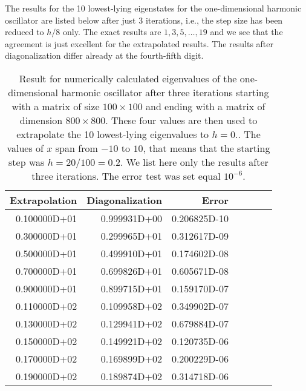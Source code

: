 The results for the 10 lowest-lying eigenstates for the one-dimensional harmonic oscillator
are listed below after just 3 iterations, i.e., the step size has been reduced to $h/8$ only.
The exact results are $1,3,5,\dots,19$ and we see that the agreement is just excellent for the 
extrapolated results. The results after diagonalization differ already at the fourth-fifth digit. 
\begin{table}[hbtp]
\caption{Result  for numerically calculated eigenvalues of the one-dimensional harmonic oscillator
         after three iterations starting with a matrix of size $100\times 100$ and ending
         with a matrix of dimension $800\times 800$. These four values are then used to
         extrapolate the 10 lowest-lying eigenvalues to $h=0.$. The values of $x$ span
         from $-10$ to $10$, that means that the starting step was $h=20/100=0.2$. We list here
         only the results after three iterations. The error test was set equal $10^{-6}$.}
\begin{center} 
\begin{tabular}{rrrrrrr}\hline
Extrapolation&Diagonalization&Error\\\hline
0.100000D+01&  0.999931D+00&  0.206825D-10\\
0.300000D+01 & 0.299965D+01 & 0.312617D-09\\
0.500000D+01 & 0.499910D+01 & 0.174602D-08\\
0.700000D+01 & 0.699826D+01 & 0.605671D-08\\
0.900000D+01 & 0.899715D+01 & 0.159170D-07\\
0.110000D+02 & 0.109958D+02 & 0.349902D-07\\
0.130000D+02 & 0.129941D+02 & 0.679884D-07\\
0.150000D+02 & 0.149921D+02 & 0.120735D-06\\
0.170000D+02 & 0.169899D+02 & 0.200229D-06\\
0.190000D+02 & 0.189874D+02 & 0.314718D-06\\\hline
\end{tabular}
\end{center}  
\end{table}     

